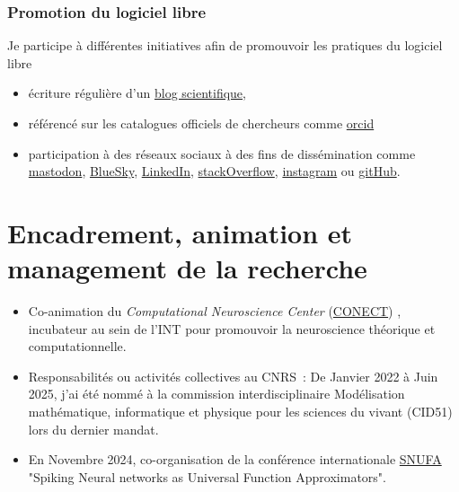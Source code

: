 \documentclass[10pt,french,a4paper,oneside]{article}%
\begin{document}
\subsubsection{Promotion du logiciel libre} %
Je participe à différentes initiatives afin de promouvoir les pratiques du logiciel libre
\begin{itemize}
	\item écriture régulière d'un \href{https://laurentperrinet.github.io/sciblog/}{blog scientifique},
	\item référencé sur les catalogues officiels de chercheurs comme \href{http://orcid.org/0000-0002-9536-010X}{orcid}
	\item participation à des réseaux sociaux à des fins de dissémination comme \href{https://neuromatch.social/@laurentperrinet}{mastodon}, \href{https://bsky.app/profile/laurentperrinet.bsky.social}{BlueSky}, \href{https://www.linkedin.com/in/laurent-perrinet-1857b9/}{LinkedIn}, \href{https://stackoverflow.com/users/234547/meduz}{stackOverflow}, \href{https://www.instagram.com/laurentperrinet/}{instagram} ou \href{https://github.com/laurentperrinet}{gitHub}.
\end{itemize}




\section{Encadrement, animation et management de la recherche}



\begin{itemize}
	
	\item Co-animation du \og \textit{Computational Neuroscience Center} (\href{https://conect-int.github.io/}{CONECT}) \fg{}, incubateur au sein de l’INT pour promouvoir la neuroscience théorique et computationnelle.
	
    \item Responsabilités ou activités collectives au CNRS~: De Janvier 2022 à Juin 2025, j'ai été nommé à la commission interdisciplinaire \og Modélisation mathématique, informatique et physique pour les sciences du vivant \fg{} (CID51) lors du dernier mandat.
	
	\item En Novembre 2024, co-organisation de la conférence internationale \href{https://laurentperrinet.github.io/post/2024-11-08-snufa/}{SNUFA} "Spiking Neural networks as Universal Function Approximators".
\end{itemize}
\end{document}
